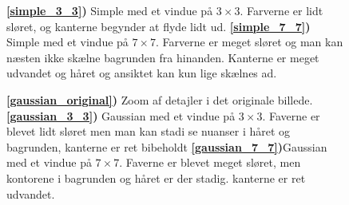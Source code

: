 {\begin{figure}[!h]
{        \textbf{\ref{simple_3_3})} Simple med et vindue på $3\times{}3$. Farverne er lidt sløret, og kanterne begynder at flyde lidt ud.
        \textbf{\ref{simple_7_7})} Simple med et vindue på $7\times{}7$. Farverne er meget sløret og man kan næsten ikke skælne bagrunden fra hinanden. Kanterne er meget udvandet og håret og ansiktet kan kun lige skælnes ad.
    }
    \label{simple_metode}
\end{figure}
\begin{figure}[!h]
    \centering
    \hspace{1em}
    \hspace{1em}
    \caption[]{
        \textbf{\ref{gaussian_original})} Zoom af detajler i det originale billede.
        \textbf{\ref{gaussian_3_3})} Gaussian med et vindue på $3\times{}3$. Faverne er blevet lidt sløret men man kan stadi se nuanser i håret og bagrunden, kanterne er ret bibeholdt
        \textbf{\ref{gaussian_7_7})}Gaussian med et vindue på $7\times{}7$. Faverne er blevet meget sløret, men kontorene i bagrunden og håret er der stadig. kanterne er ret udvandet.
    }
    \label{gaussian_metode}
\end{figure}

}
